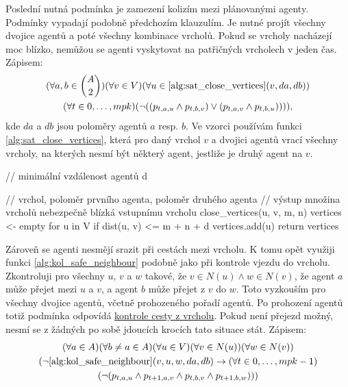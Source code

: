 Poslední nutná podmínka je zamezení kolizím mezi plánovanými agenty.
Podmínky vypadají podobně předchozím klauzulím.
Je nutné projít všechny dvojice agentů a poté všechny kombinace vrcholů.
Pokud se vrcholy nacházejí moc blízko, nemůžou se agenti vyskytovat na patřičných vrcholech v jeden čas.
Zápisem:
\begin{gather*}
(\forall a, b \in {A \choose 2})(\forall v \in V)(\forall u \in \ref{alg:sat_close_vertices}(v, da, db))
	\\
	(\forall t \in {0, \dots, mpk})
	(\neg ((p_{t, a, u} \wedge p_{t, b, v}) \vee (p_{t, a, v} \wedge p_{t, b, u})))),
\end{gather*}
kde $da$ a $db$ jsou poloměry agentů $a$ resp. $b$.
Ve vzorci používám funkci \ref{alg:sat_close_vertices}, která pro daný vrchol $v$ a dvojici agentů
vrací všechny vrcholy, na kterých nesmí být některý agent, jestliže je druhý agent na $v$.
\begin{code}[fontsize=\footnotesize]
// minimální vzdálenost agentů d

// vrchol, poloměr prvního agenta, poloměr druhého agenta
// výstup množina vrcholů nebezpečně blízká vstupnímu vrcholu
close_vertices(u, v, m, n)
	vertices <- empty
	for u in V
		if dist(u, v) <= m + n + d
		vertices.add(u)
	return vertices
\end{code}

Zároveň se agenti nesmějí srazit při cestách mezi vrcholu.
K tomu opět využiji funkci \ref{alg:kol_safe_neighbour} podobně jako při kontrole vjezdu do vrcholu.
Zkontroluji pro všechny $u$, $v$ a $w$ takové, že $v \in N(u) \wedge w \in N(v)$,
že agent $a$ může přejet mezi $u$ a $v$, a agent $b$ může přejet z $v$ do $w$.
Toto vyzkouším pro všechny dvojice agentů, včetně prohozeného pořadí agentů.
Po prohození agentů totiž podmínka odpovídá \hyperref[subsec:cesta_z_vrcholu]{kontrole cesty z vrcholu}.
Pokud není přejezd možný, nesmí se z žádných po sobě jdoucích krocích tato situace stát.
Zápisem:
\begin{gather*}
(\forall a \in A)(\forall b \neq a \in A)(\forall u \in V)
	(\forall v \in N(u))(\forall w \in N(v)) \\
	(\neg \ref{alg:kol_safe_neighbour}(v, u, w, da, db) \rightarrow
	(\forall t \in {0, \dots, mpk - 1}) \\
	(\neg (p_{t, a, u} \wedge p_{t + 1, a, v} \wedge p_{t, b, v} \wedge p_{t + 1, b, w}))
	)
\end{gather*}

